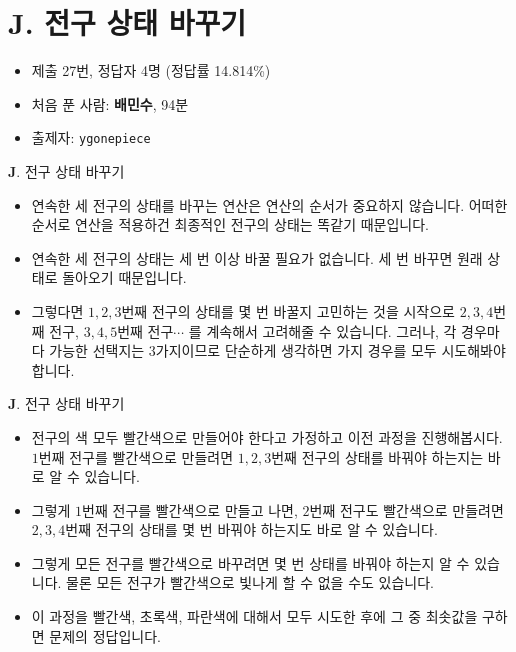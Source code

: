 \section{J. 전구 상태 바꾸기}

\begin{frame} %
    \begin{itemize}
        \item 제출 27번, 정답자 4명 (정답률 14.814\%)
        \item 처음 푼 사람: \textbf{배민수}, 94분
        \item 출제자: \texttt{ygonepiece}
    \end{itemize}
\end{frame}

\begin{frame}{\textbf{J}. 전구 상태 바꾸기}
    \begin{itemize}
        \item 연속한 세 전구의 상태를 바꾸는 연산은 연산의 순서가 중요하지 않습니다. 어떠한 순서로 연산을 적용하건 최종적인 전구의 상태는 똑같기 때문입니다.
        \item 연속한 세 전구의 상태는 세 번 이상 바꿀 필요가 없습니다. 세 번 바꾸면 원래 상태로 돌아오기 때문입니다.
        \item 그렇다면 $1, 2, 3$번째 전구의 상태를 몇 번 바꿀지 고민하는 것을 시작으로 $2, 3, 4$번째 전구, $3, 4, 5$번째 전구$\cdots$ 를 계속해서 고려해줄 수 있습니다. 그러나, 각 경우마다 가능한 선택지는 $3$가지이므로 단순하게 생각하면 가지 경우를 모두 시도해봐야 합니다.
    \end{itemize}
\end{frame}

\begin{frame}{\textbf{J}. 전구 상태 바꾸기}
    \begin{itemize}
        \item 전구의 색 모두 빨간색으로 만들어야 한다고 가정하고 이전 과정을 진행해봅시다. $1$번째 전구를 빨간색으로 만들려면 $1, 2, 3$번째 전구의 상태를 바꿔야 하는지는 바로 알 수 있습니다.
        \item 그렇게 $1$번째 전구를 빨간색으로 만들고 나면, $2$번째 전구도 빨간색으로 만들려면 $2, 3, 4$번째 전구의 상태를 몇 번 바꿔야 하는지도 바로 알 수 있습니다.
        \item 그렇게 모든 전구를 빨간색으로 바꾸려면 몇 번 상태를 바꿔야 하는지 알 수 있습니다. 물론 모든 전구가 빨간색으로 빛나게 할 수 없을 수도 있습니다.
        \item 이 과정을 빨간색, 초록색, 파란색에 대해서 모두 시도한 후에 그 중 최솟값을 구하면 문제의 정답입니다.
    \end{itemize}
\end{frame}